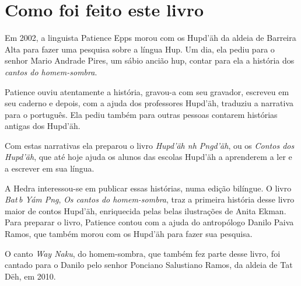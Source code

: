 \chapter{Como foi feito este livro}

Em 2002, a linguista Patience Epps morou com os Hupd’äh da aldeia de Barreira Alta para fazer uma pesquisa sobre a língua Hup. Um dia, ela pediu para o senhor Mario Andrade Pires, um sábio ancião hup, contar para ela a história dos \textit{cantos do homem-sombra}.

Patience ouviu atentamente a história, gravou-a com seu gravador, escreveu em seu caderno e depois, com a ajuda dos professores Hupd’äh, traduziu a narrativa para o português. Ela pediu também para outras pessoas contarem histórias antigas dos Hupd’äh.

Com estas narrativas ela preparou o livro \textit{Hupd’äh n\ii{}h P\ii{}n\II{}gd’äh}, ou os \textit{Contos dos Hupd’äh}, que até hoje ajuda os alunos das escolas Hupd’äh a aprenderem a ler e a escrever em sua língua.

A Hedra interessou-se em publicar essas histórias, numa edição bilíngue. O livro \textit{Bat\II{}\,b Yám P\ii n\II g}, \textit{Os cantos do homem-sombra}, traz a primeira história desse livro maior de contos Hupd’äh, enriquecida pelas belas ilustrações de Anita Ekman. Para preparar o livro, Patience contou com a ajuda do antropólogo Danilo Paiva Ramos, que também morou com os Hupd’äh para fazer sua pesquisa.

O canto \textit{Way Naku}, do homem-sombra, que também fez parte desse livro, foi cantado
para o Danilo pelo senhor Ponciano Salustiano Ramos, da aldeia de Tat Dëh, em 2010.


